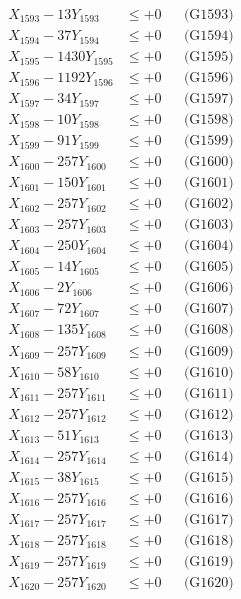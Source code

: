 \documentclass[a4paper,10pt]{article}
\begin{document}
{\begin{align}
X_{1593} - 13Y_{1593} &\leq +0 && \text{(G1593)} \\
X_{1594} - 37Y_{1594} &\leq +0 && \text{(G1594)} \\
X_{1595} - 1430Y_{1595} &\leq +0 && \text{(G1595)} \\
X_{1596} - 1192Y_{1596} &\leq +0 && \text{(G1596)} \\
X_{1597} - 34Y_{1597} &\leq +0 && \text{(G1597)} \\
X_{1598} - 10Y_{1598} &\leq +0 && \text{(G1598)} \\
X_{1599} - 91Y_{1599} &\leq +0 && \text{(G1599)} \\
X_{1600} - 257Y_{1600} &\leq +0 && \text{(G1600)} \\
\allowbreak
X_{1601} - 150Y_{1601} &\leq +0 && \text{(G1601)} \\
X_{1602} - 257Y_{1602} &\leq +0 && \text{(G1602)} \\
X_{1603} - 257Y_{1603} &\leq +0 && \text{(G1603)} \\
X_{1604} - 250Y_{1604} &\leq +0 && \text{(G1604)} \\
X_{1605} - 14Y_{1605} &\leq +0 && \text{(G1605)} \\
X_{1606} - 2Y_{1606} &\leq +0 && \text{(G1606)} \\
X_{1607} - 72Y_{1607} &\leq +0 && \text{(G1607)} \\
X_{1608} - 135Y_{1608} &\leq +0 && \text{(G1608)} \\
X_{1609} - 257Y_{1609} &\leq +0 && \text{(G1609)} \\
X_{1610} - 58Y_{1610} &\leq +0 && \text{(G1610)} \\
\allowbreak
X_{1611} - 257Y_{1611} &\leq +0 && \text{(G1611)} \\
X_{1612} - 257Y_{1612} &\leq +0 && \text{(G1612)} \\
X_{1613} - 51Y_{1613} &\leq +0 && \text{(G1613)} \\
X_{1614} - 257Y_{1614} &\leq +0 && \text{(G1614)} \\
X_{1615} - 38Y_{1615} &\leq +0 && \text{(G1615)} \\
X_{1616} - 257Y_{1616} &\leq +0 && \text{(G1616)} \\
X_{1617} - 257Y_{1617} &\leq +0 && \text{(G1617)} \\
X_{1618} - 257Y_{1618} &\leq +0 && \text{(G1618)} \\
X_{1619} - 257Y_{1619} &\leq +0 && \text{(G1619)} \\
X_{1620} - 257Y_{1620} &\leq +0 && \text{(G1620)} \\

\end{align}}
\end{document}
